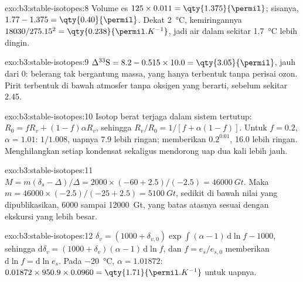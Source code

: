 \begin{solution}{exo:b3:stable-isotopes:8}
Volume es $125\times0.011 = \qty{1.375}{\permil}$; sisanya, $1.77 - 1.375 =
\qty{0.40}{\permil}$. Dekat \qty{2}{\celsius}, kemiringannya $18030/275.15^2 =
\qty{0.238}{\permil.K^{-1}}$, jadi air dalam sekitar \qty{1.7}{\celsius}
lebih dingin.
\end{solution}

\begin{solution}{exo:b3:stable-isotopes:9}
$\Delta^{33}\mathrm S = 8.2 - 0.515\times10.0 = \qty{3.05}{\permil}$, jauh dari 0:
belerang tak bergantung massa, yang hanya terbentuk tanpa perisai ozon. Pirit
terbentuk di bawah atmosfer tanpa oksigen yang berarti, sebelum sekitar
\qty{2.45}{\Ga}.
\end{solution}

\begin{solution}{exo:b3:stable-isotopes:10}
Isotop berat terjaga dalam sistem tertutup: $R_0 = fR_v + (1 -
f)\alpha R_v$, sehingga $R_v/R_0 = 1/[f + \alpha(1 - f)]$. Untuk $f = 0.2$, $\alpha =
1.01$: $1/1.008$, uapnya \qty{7.9}{\permil} lebih ringan;  memberikan
$0.2^{0.01}$, \qty{16.0}{\permil} lebih ringan. Menghilangkan setiap kondensat sekaligus
mendorong uap dua kali lebih jauh.
\end{solution}

\begin{solution}{exo:b3:stable-isotopes:11}
$M = m(\delta_s - \Delta)/\Delta = 2000\times(-60 + 2.5)/(-2.5) = \qty{46000}{Gt}$.
Maka $m = 46000\times(-2.5)/(-25 + 2.5) = \qty{5100}{Gt}$, sedikit di bawah
nilai yang dipublikasikan, 6000 sampai \qty{12000}{Gt}, yang batas atasnya
sesuai dengan ekskursi yang lebih besar.
\end{solution}

\begin{solution}{exo:b3:stable-isotopes:12}
$\delta_v = (1000 + \delta_{v,0})\exp\int(\alpha - 1)\,\mathrm d\ln f - 1000$, sehingga
$\mathrm d\delta_v = (1000 + \delta_v)(\alpha - 1)\,\mathrm d\ln f$, dan $f =
e_s/e_{s,0}$ memberikan $\mathrm d\ln f = \mathrm d\ln e_s$. Pada \qty{-20}{\celsius},
$\alpha = 1.01872$: $0.01872\times950.9\times0.0960 =
\qty{1.71}{\permil.K^{-1}}$ untuk uapnya.
\end{solution}

